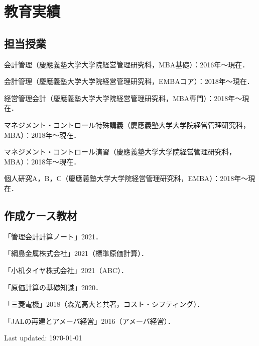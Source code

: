 \documentclass[letterpaper,uplatex]{article}
\def\footerlink{http://jblevins.org/projects/cv-template/}
\renewenvironment{itemize}{
  \begin{list}{}{
    \setlength{\leftmargin}{1.5em}
  }
}{
  \end{list}
}
\begin{document}
\section*{教育実績}

\subsection*{担当授業}

\begin{itemize}
    \item 会計管理（慶應義塾大学大学院経営管理研究科，MBA基礎）：2016年〜現在．
    \item 会計管理（慶應義塾大学大学院経営管理研究科，EMBAコア）：2018年〜現在．
    \item 経営管理会計（慶應義塾大学大学院経営管理研究科，MBA専門）：2018年〜現在．
    \item マネジメント・コントロール特殊講義（慶應義塾大学大学院経営管理研究科，MBA）：2018年〜現在．
    \item マネジメント・コントロール演習（慶應義塾大学大学院経営管理研究科，MBA）：2018年〜現在．
    \item 個人研究A，B，C（慶應義塾大学大学院経営管理研究科，EMBA）：2018年〜現在．
\end{itemize}

\subsection*{作成ケース教材}

\begin{itemize}
    \item 「管理会計計算ノート」2021．
    \item 「綱島金属株式会社」2021（標準原価計算）．
    \item 「小机タイヤ株式会社」2021（ABC）．
   \item 「原価計算の基礎知識」2020． 
   \item 「三菱電機」2018（森光高大と共著，コスト・シフティング）．
   \item 「JALの再建とアメーバ経営」2016（アメーバ経営）．
\end{itemize}

\bigskip

\begin{center}
  \begin{footnotesize}
    Last updated: \today \\
  \end{footnotesize}
\end{center}
\end{document}
